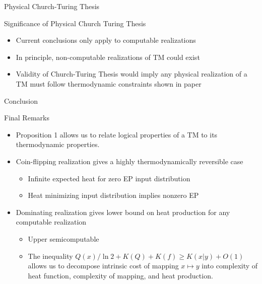\begin{frame}{Physical Church-Turing Thesis}
\begin{block}{Significance of Physical Church Turing Thesis}
\begin{itemize}
    \item Current conclusions only apply to computable realizations
    \item In principle, non-computable realizations of TM could exist 
    \item Validity of Church-Turing Thesis would imply any physical realization of a TM must follow thermodynamic constraints shown in paper
\end{itemize}
\end{block}
\end{frame}

\begin{frame}{Conclusion}
\begin{block}{Final Remarks}
\begin{itemize}
    \item Proposition 1 allows us to relate logical properties of a TM to its thermodynamic properties.
    \item Coin-flipping realization gives a highly thermodynamically reversible case
    \begin{itemize}
        \item Infinite expected heat for zero EP input distribution
        \item Heat minimizing input distribution implies nonzero EP
    \end{itemize}
    \item Dominating realization gives lower bound on heat production for any computable realization
    \begin{itemize}
        \item Upper semicomputable
        \item The inequality $ Q(x)/\ln 2 + K(Q) + K(f) \ge K(x|y) + O(1)$ allows us to decompose intrinsic cost of mapping $x\mapsto y$ into complexity of heat function, complexity of mapping, and heat production.
    \end{itemize}
\end{itemize}
\end{block}
\end{frame}